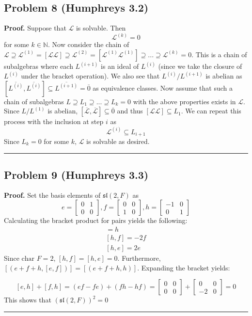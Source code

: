 \documentclass[12pt]{article}%
\newenvironment{proof}[1][Proof]{\textbf{#1.} }{\ \rule{0.5em}{0.5em}}
\begin{document}
  \subsection*{Problem 8 (Humphreys 3.2)}
  \begin{proof}
    Suppose that $\mathcal{L}$ is solvable. Then $$\mathcal{L}^{(k)} = 0 $$ for some $k \in \mathbb{N}$.
    Now consider the chain of $\mathcal{L} \supseteq \mathcal{L}^{(1)} = [\mathcal{L}\mathcal{L}] \supseteq \mathcal{L}^{(2)} = [\mathcal{L}^{(1)}\mathcal{L}^{(1)}] \supseteq ... \supseteq \mathcal{L}^{(k)} = 0$. This is a chain of subalgebras where each $L^{(i+1)}$ is an ideal of $L^{(i)}$ (since we take the closure of $L^{(i)}$ under the bracket operation). We also see that $L^{(i)}/L^{(i+1)}$ is abelian as $[\overline{L^{(i)}},\overline{L^{(i)}}] \subseteq \overline{L^{(i+1)}} = \overline{0}$ as equivalence classes. Now assume that such a chain of subalgebras $L \supseteq L_1 \supseteq ... \supseteq L_k = 0$ with the above properties exists in $\mathcal{L}$. Since $L/L^{(1)}$ is abelian, $[\overline{\mathcal{L}},\overline{\mathcal{L}}] \subseteq \overline{0}$ and thus $[\mathcal{L}\mathcal{L}] \subseteq L_1$. We can repeat this process with the inclusion at step $i$ as $$ \mathcal{L}^{(i)} \subseteq L_{i+1} $$ Since $L_k = 0$ for some $k$, $\mathcal{L}$ is solvable as desired.
  \end{proof}
  \subsection*{Problem 9 (Humphreys 3.3)}
  \begin{proof}
    Set the basis elements of $\mathfrak{sl}(2,F)$ as
    $$ e = \left[ \begin{array}{ccc}
      0 & 1 \\
      0 & 0 \end{array} \right], f = \left[ \begin{array}{ccc}
      0 & 0 \\
      1 & 0 \end{array} \right], h = \left[ \begin{array}{ccc}
      -1 & 0 \\
      0 & 1 \end{array} \right]  $$ Calculating the bracket product for pairs yields the following:
      \begin{gather}
        [e,f] = h \\
        [h,f] = -2f \\
        [h,e] = 2e
      \end{gather} Since $\text{char } F = 2$, $[h,f] = [h,e] = 0$. Furthermore, $[(e+f+h,[e,f])] = [(e+f+h,h)]$. Expanding the bracket yields:

      $$ [e,h] + [f,h] = (ef - fe) + (fh - hf) = \left[ \begin{array}{ccc} 0 & 0 \\ 0 & 0 \end{array} \right] + \left[ \begin{array}{ccc} 0 & 0 \\ -2 & 0 \end{array} \right] = 0 $$ This shows that $(\mathfrak{sl}(2,F))^2 = 0$
  \end{proof}
\end{document}
